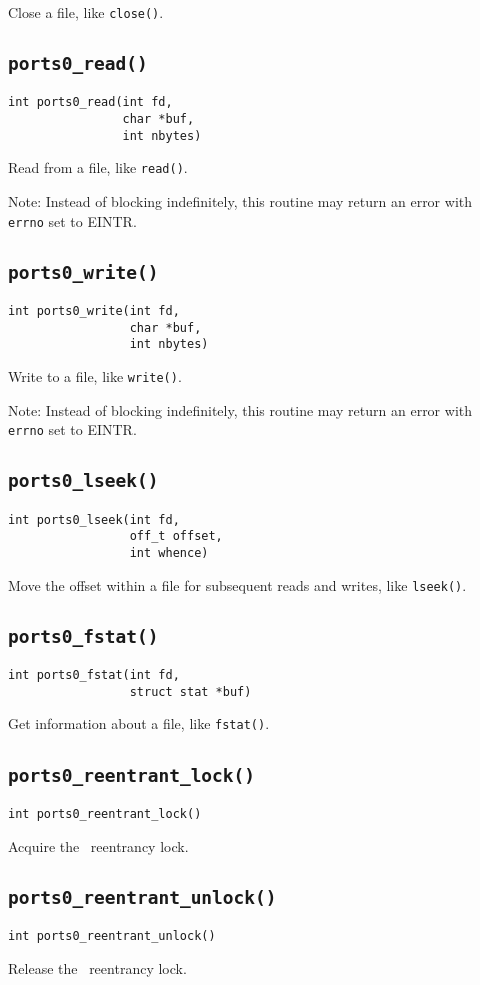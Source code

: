 Close a file, like {\tt close()}.


\subsection{\tt ports0\_read()}
\begin{verbatim}
int ports0_read(int fd,
                char *buf,
                int nbytes)
\end{verbatim}

Read from a file, like {\tt read()}.

Note: Instead of blocking indefinitely, this routine may return an
error with {\tt errno} set to EINTR.


\subsection{\tt ports0\_write()}
\begin{verbatim}
int ports0_write(int fd,
                 char *buf,
                 int nbytes)
\end{verbatim}

Write to a file, like {\tt write()}.

Note: Instead of blocking indefinitely, this routine may return an
error with {\tt errno} set to EINTR.


\subsection{\tt ports0\_lseek()}
\begin{verbatim}
int ports0_lseek(int fd,
                 off_t offset,
                 int whence)
\end{verbatim}

Move the offset within a file for subsequent reads and writes, like
{\tt lseek()}.


\subsection{\tt ports0\_fstat()}
\begin{verbatim}
int ports0_fstat(int fd,
                 struct stat *buf)
\end{verbatim}

Get information about a file, like {\tt fstat()}.


\subsection{\tt ports0\_reentrant\_lock()}
\begin{verbatim}
int ports0_reentrant_lock()
\end{verbatim}

Acquire the \portszero\ reentrancy lock.  


\subsection{\tt ports0\_reentrant\_unlock()}
\begin{verbatim}
int ports0_reentrant_unlock()
\end{verbatim}

Release the \portszero\ reentrancy lock.  





